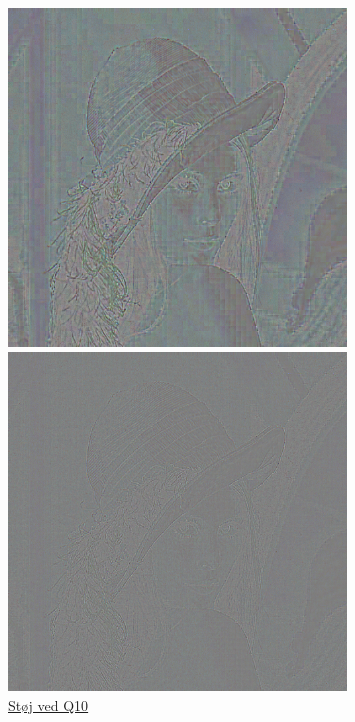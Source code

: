 \begin{figure}
\begin{minipage}[b]{0.31\linewidth}
\centering
\includegraphics[width=0.8\textwidth]{Billeder/fejlbilleder/fejl10.png}
\caption{\href{https://www.dropbox.com/home/P1\%20-\%20B205/vejleder/billeder/DCT/Fejlbilleder?preview=fejl10.png}{Støj ved Q10}}
\label{fig:noiseQ10}
\end{minipage}
\hspace{0.2cm}
\begin{minipage}[b]{0.31\linewidth}
\centering
\includegraphics[width=0.8\textwidth]{Billeder/fejlbilleder/fejl50.png}

\end{minipage}
\end{figure}
